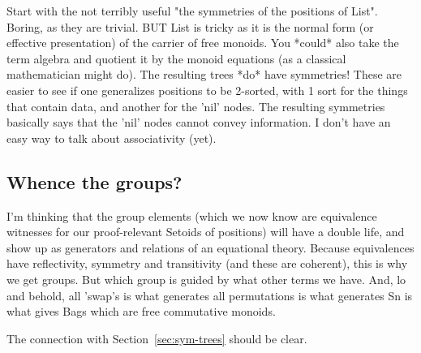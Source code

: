 \documentclass{article} %
\theoremstyle{plain}
\theoremstyle{definition}
\begin{document}
Start with the not terribly useful "the symmetries of the positions of List".
Boring, as they are trivial. BUT List is tricky as it is the normal form (or
effective presentation) of the carrier of free monoids. You *could* also take
the term algebra and quotient it by the monoid equations (as a classical
mathematician might do). The resulting trees *do* have symmetries! These are
easier to see if one generalizes positions to be 2-sorted, with 1 sort for the
things that contain data, and another for the 'nil' nodes. The resulting
symmetries basically says that the 'nil' nodes cannot convey information. I
don't have an easy way to talk about associativity (yet).  

\subsection{Whence the groups?}

I'm thinking that the group elements (which we now know are equivalence
witnesses for our proof-relevant Setoids of positions) will have a double life,
and show up as generators and relations of an equational theory. Because
equivalences have reflectivity, symmetry and transitivity (and these are
coherent), this is why we get groups. But which group is guided by what other
terms we have. And, lo and behold, all 'swap's is what generates all
permutations is what generates Sn is what gives Bags which are free commutative
monoids.

The connection with Section~\ref{sec:sym-trees} should be clear.
\end{document}
